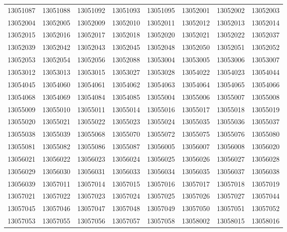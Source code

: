 \documentclass[abstract = on,listof=totoc, bibliography=totoc]{scrreprt}
\begin{document}
{\begin{longtable}{cccccccc}
13051087  &  13051088  &  13051092  &  13051093  &  13051095  &  13052001  &  13052002  &  13052003  \\ 
13052004  &  13052005  &  13052009  &  13052010  &  13052011  &  13052012  &  13052013  &  13052014  \\ 
13052015  &  13052016  &  13052017  &  13052018  &  13052020  &  13052021  &  13052022  &  13052037  \\ 
13052039  &  13052042  &  13052043  &  13052045  &  13052048  &  13052050  &  13052051  &  13052052  \\ 
13052053  &  13052054  &  13052056  &  13052088  &  13053004  &  13053005  &  13053006  &  13053007  \\ 
13053012  &  13053013  &  13053015  &  13053027  &  13053028  &  13054022  &  13054023  &  13054044  \\ 
13054045  &  13054060  &  13054061  &  13054062  &  13054063  &  13054064  &  13054065  &  13054066  \\ 
13054068  &  13054069  &  13054084  &  13054085  &  13055004  &  13055006  &  13055007  &  13055008  \\ 
13055009  &  13055010  &  13055011  &  13055014  &  13055016  &  13055017  &  13055018  &  13055019  \\ 
13055020  &  13055021  &  13055022  &  13055023  &  13055024  &  13055035  &  13055036  &  13055037  \\ 
13055038  &  13055039  &  13055068  &  13055070  &  13055072  &  13055075  &  13055076  &  13055080  \\ 
13055081  &  13055082  &  13055086  &  13055087  &  13056005  &  13056007  &  13056008  &  13056020  \\ 
13056021  &  13056022  &  13056023  &  13056024  &  13056025  &  13056026  &  13056027  &  13056028  \\ 
13056029  &  13056030  &  13056031  &  13056033  &  13056034  &  13056035  &  13056037  &  13056038  \\ 
13056039  &  13057011  &  13057014  &  13057015  &  13057016  &  13057017  &  13057018  &  13057019  \\ 
13057021  &  13057022  &  13057023  &  13057024  &  13057025  &  13057026  &  13057027  &  13057044  \\ 
13057045  &  13057046  &  13057047  &  13057048  &  13057049  &  13057050  &  13057051  &  13057052  \\ 
13057053  &  13057055  &  13057056  &  13057057  &  13057058  &  13058002  &  13058015  &  13058016  \\ 

\end{longtable}}
\end{document}
